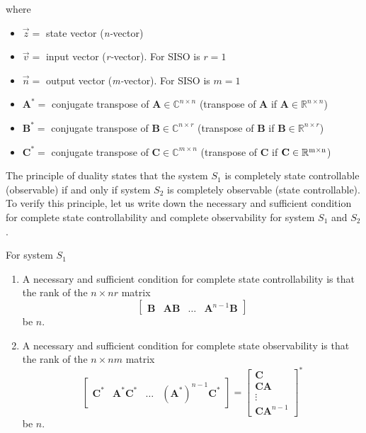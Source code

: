 \documentclass[11pt,a4paper,oneside]{book}
\numberwithin{equation}{section}
\theoremstyle{it}
\theoremstyle{definition}
\begin{document}
where	\begin{itemize} 
	\item $\vec z = $ state vector (\textit{n-}vector)
	\item $\vec v = $ input vector (\textit{r-}vector). For SISO is $r=1$
	\item $\vec n = $ output vector (\textit{m-}vector). For SISO is $m=1$
	\item $ \mathbf{A}^* = $ conjugate transpose of $\mathbf{A} 
	\in\mathbb{C}^{n \times n}$ (transpose of $\mathbf{A}$ if 
	$\mathbf{A}\in\mathbb{R}^{n \times n}$) 
	\item $ \mathbf{B}^* = $ conjugate transpose of $\mathbf{B}\in\mathbb{C}^{n 
	\times r}$ (transpose of $\mathbf{B}$ if $\mathbf{B}\in\mathbb{R}^{n \times 
	r}$)
	\item $ \mathbf{C}^* = $ conjugate transpose of $\mathbf{C}\in\mathbb{C}^{m 
	\times n}$ (transpose of $\mathbf{C}$ if $\mathbf{C} \in  \rm \mathbb{R}^{m 
	\times n}$)
\end{itemize}
The principle of duality states that the system $S_1$ is completely state controllable (observable) if and only if system $S_2$ is completely observable (state controllable).
To verify this principle, let us write down the necessary and sufficient 
condition for complete state controllability and complete observability for 
system $S_1$ and $S_2$. 

\noindent For system $S_1$
\begin{enumerate}[label=\textbf{\arabic*}]
	\item A necessary and sufficient condition for complete state 
	controllability is that the rank of the $n 	\times nr$ matrix 
	$$
	\begin{bmatrix}
		\mathbf{B} & \mathbf{AB} & \dots & \mathbf{A}^{n-1}\mathbf{B}
	\end{bmatrix}
	$$
	be $n$.
	\item A necessary and sufficient condition for complete state observability is that the rank of the $n 	\times nm$ matrix 
	$$
	\begin{bmatrix}
		\mathbf{C}^* & \mathbf{A}^*\mathbf{C}^* & \dots & (\mathbf{A}^*)^{n-1}\mathbf{C}^*
	\end{bmatrix} = 
	\begin{bmatrix}
		\mathbf{C}  \\
		\mathbf{CA} \\
		\vdots \\
		\mathbf{CA}^{n-1}
	\end{bmatrix}^*
	$$
	be $n$.
\end{enumerate}
\end{document}
